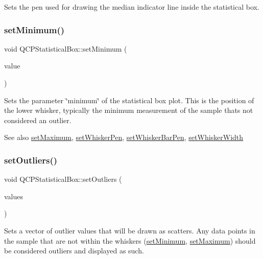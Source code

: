 Sets the pen used for drawing the median indicator line inside the statistical box. \hypertarget{class_q_c_p_statistical_box_a84ff7cc61ba44890f0c3e0c99c19941e}{}\label{class_q_c_p_statistical_box_a84ff7cc61ba44890f0c3e0c99c19941e} 
\subsubsection{\texorpdfstring{set\+Minimum()}{setMinimum()}}
{\footnotesize\ttfamily void Q\+C\+P\+Statistical\+Box\+::set\+Minimum (\begin{DoxyParamCaption}\item[{double}]{value }\end{DoxyParamCaption})}

Sets the parameter \char`\"{}minimum\char`\"{} of the statistical box plot. This is the position of the lower whisker, typically the minimum measurement of the sample that\textquotesingle{}s not considered an outlier.

\begin{DoxySeeAlso}{See also}
\hyperlink{class_q_c_p_statistical_box_acec5ad1901f00f2c5387cfb4d9787eb3}{set\+Maximum}, \hyperlink{class_q_c_p_statistical_box_a4a5034cb3b9b040444df05ab1684620b}{set\+Whisker\+Pen}, \hyperlink{class_q_c_p_statistical_box_aa8d3e503897788e1abf68dc74b5f147f}{set\+Whisker\+Bar\+Pen}, \hyperlink{class_q_c_p_statistical_box_adf378812446bd66f34d1f7f293d991cd}{set\+Whisker\+Width} 
\end{DoxySeeAlso}
\hypertarget{class_q_c_p_statistical_box_af9bc09620e0bf93bf444ee35e5800d1d}{}\label{class_q_c_p_statistical_box_af9bc09620e0bf93bf444ee35e5800d1d} 
\subsubsection{\texorpdfstring{set\+Outliers()}{setOutliers()}}
{\footnotesize\ttfamily void Q\+C\+P\+Statistical\+Box\+::set\+Outliers (\begin{DoxyParamCaption}\item[{const Q\+Vector$<$ double $>$ \&}]{values }\end{DoxyParamCaption})}

Sets a vector of outlier values that will be drawn as scatters. Any data points in the sample that are not within the whiskers (\hyperlink{class_q_c_p_statistical_box_a84ff7cc61ba44890f0c3e0c99c19941e}{set\+Minimum}, \hyperlink{class_q_c_p_statistical_box_acec5ad1901f00f2c5387cfb4d9787eb3}{set\+Maximum}) should be considered outliers and displayed as such.

